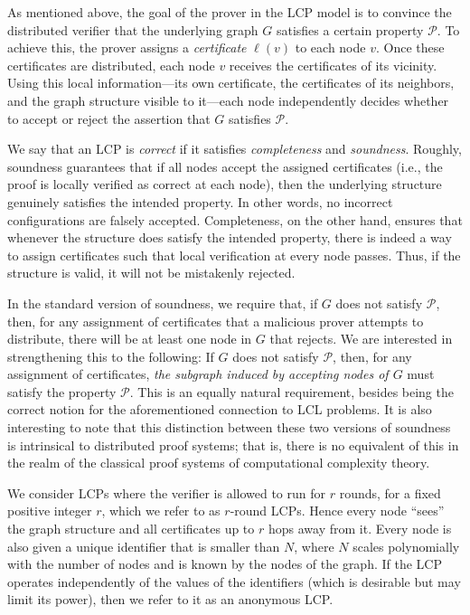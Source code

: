 \documentclass[11pt]{article}
\begin{document}
As mentioned above, the goal of the prover in the LCP model is to convince the
distributed verifier that the underlying graph $G$ satisfies a certain property
$\mathcal{P}$.
To achieve this, the prover assigns a \emph{certificate} \( \ell(v) \) to each
node \( v \). Once these certificates are distributed, each node \( v \)
receives the certificates of its vicinity. Using this local information---its
own certificate, the certificates of its neighbors, and the graph structure
visible to it---each node independently decides whether to accept or reject the
assertion that \( G \) satisfies \( \mathcal{P} \). 

We say that an LCP is \emph{correct} if it satisfies \emph{completeness} and \emph{soundness}. Roughly, soundness guarantees that if all nodes accept the assigned certificates (i.e., the proof is locally verified as correct at each node), then the underlying structure genuinely satisfies the intended property. In other words, no incorrect configurations are falsely accepted. Completeness, on the other hand, ensures that whenever the structure does satisfy the intended property, there is indeed a way to assign certificates such that local verification at every node passes. Thus, if the structure is valid, it will not be mistakenly rejected. 

In the standard version of soundness, we require that, if $G$ does not satisfy
$\mathcal{P}$, then, for any assignment of certificates that a malicious prover
attempts to distribute, there will be at least one node in $G$ that rejects.
We are interested in strengthening this to the following:
If $G$ does not satisfy $\mathcal{P}$, then, for any assignment of certificates,
\emph{the subgraph induced by accepting nodes of $G$} must satisfy the property
$\mathcal{P}$.
This is an equally natural requirement, besides being the correct notion for the
aforementioned connection to LCL problems.
It is also interesting to note that this distinction between these two versions
of soundness is intrinsical to distributed proof systems; that is, there is no
equivalent of this in the realm of the classical proof systems of computational
complexity theory.

We consider LCPs where the verifier is allowed to run for $r$ rounds, for a
fixed positive integer $r$, which we refer to as $r$-round LCPs.
Hence every node \enquote{sees} the graph structure and all certificates up to
$r$ hops away from it.
Every node is also given a unique identifier that is smaller than $N$, where $N$
scales polynomially with the number of nodes and is known by the nodes of the
graph.
If the LCP operates independently of the values of the identifiers (which is
desirable but may limit its power), then we refer to it as an anonymous LCP.
\end{document}
